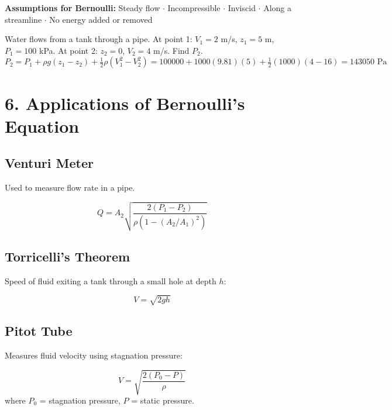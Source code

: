 \documentclass[12pt]{article}
\begin{document}
\begin{notebox}
\textbf{Assumptions for Bernoulli:} Steady flow $\cdot$ Incompressible $\cdot$ Inviscid $\cdot$ Along a streamline $\cdot$ No energy added or removed
\end{notebox}

\begin{examplebox*}
Water flows from a tank through a pipe. At point 1: $V_1 = 2$ m/s, $z_1 = 5$ m, $P_1 = 100$ kPa. At point 2: $z_2 = 0$, $V_2 = 4$ m/s. Find $P_2$.
\[
  P_2 = P_1 + \rho g(z_1-z_2) + \tfrac{1}{2}\rho(V_1^2 - V_2^2)
      = 100000 + 1000(9.81)(5) + \tfrac{1}{2}(1000)(4-16)
      = 143050 \text{ Pa}
\]
\end{examplebox*}

\section{6. Applications of Bernoulli's Equation}

\subsection{Venturi Meter}

Used to measure flow rate in a pipe.

\begin{formulabox}
\[
  Q = A_2\sqrt{\frac{2(P_1 - P_2)}{\rho\!\left(1 - (A_2/A_1)^2\right)}}
\]
\end{formulabox}

\subsection{Torricelli's Theorem}

Speed of fluid exiting a tank through a small hole at depth $h$:

\begin{formulabox}
\[
  V = \sqrt{2gh}
\]
\end{formulabox}

\subsection{Pitot Tube}

Measures fluid velocity using stagnation pressure:

\begin{formulabox}
\[
  V = \sqrt{\frac{2(P_0 - P)}{\rho}}
\]
where $P_0$ = stagnation pressure, $P$ = static pressure.
\end{formulabox}
\end{document}
